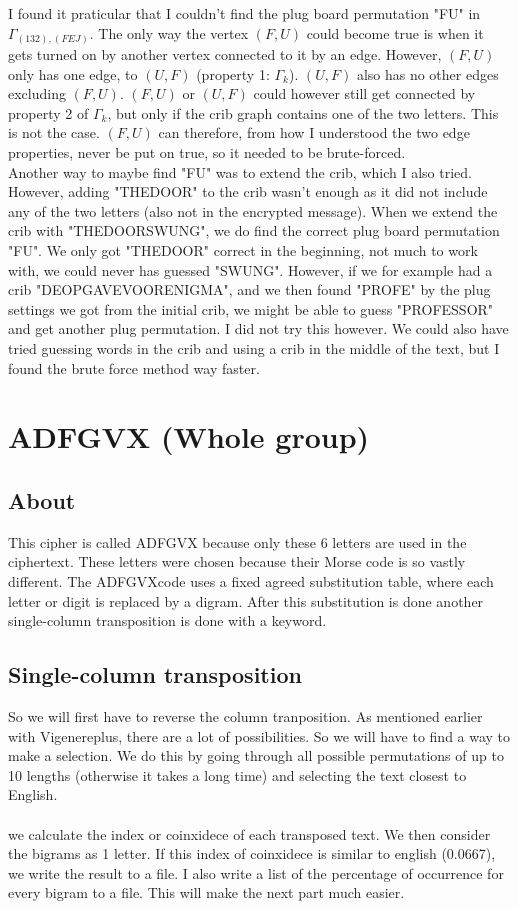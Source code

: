 \documentclass{article}
\begin{document}
I found it praticular that I couldn't find the plug board permutation "FU" in $\Gamma_{(132),(FEJ)}$. The only way the vertex $(F,U)$ could become true is when it gets turned on by another vertex connected to it by an edge. However, $(F,U)$ only has one edge, to $(U,F)$ (property 1: $\Gamma_k$). $(U,F)$ also has no other edges excluding $(F,U)$. $(F,U)$ or $(U,F)$ could however still get connected by property 2 of $\Gamma_k$, but only if the crib graph contains one of the two letters. This is not the case. $(F,U)$ can therefore, from how I understood the two edge properties, never be put on true, so it needed to be brute-forced.\\

Another way to maybe find "FU" was to extend the crib, which I also tried. However, adding "THEDOOR" to the crib wasn't enough as it did not include any of the two letters (also not in the encrypted message). When we extend the crib with "THEDOORSWUNG", we do find the correct plug board permutation "FU". We only got "THEDOOR" correct in the beginning, not much to work with, we could never has guessed "SWUNG". However, if we for example had a crib "DEOPGAVEVOORENIGMA", and we then found "PROFE" by the plug settings we got from the initial crib, we might be able to guess "PROFESSOR" and get another plug permutation. I did not try this however. We could also have tried guessing words in the crib and using a crib in the middle of the text, but I found the brute force method way faster.\\

\newpage

\section{ADFGVX (Whole group)}
\subsection{About}
This cipher is called ADFGVX because only these 6 letters are used in the ciphertext. These letters were chosen because their Morse code is so vastly different. The ADFGVXcode uses a fixed agreed substitution table, where each letter or digit is replaced by a digram.  After this substitution is done another single-column transposition is done with a keyword.
\subsection{Single-column transposition}
So we will first have to reverse the column tranposition. As mentioned earlier with Vigenereplus, there are a lot of possibilities. So we will have to find a way to make a selection. We do this by going through all possible permutations of up to 10 lengths (otherwise it takes a long time) and selecting the text closest to English.\\
\\
we calculate the index or coinxidece of each transposed text. We then consider the bigrams as 1 letter. If this index of coinxidece is similar to english (0.0667), we write the result to a file. I also write a list of the percentage of occurrence for every bigram to a file. This will make the next part much easier.
\end{document}
